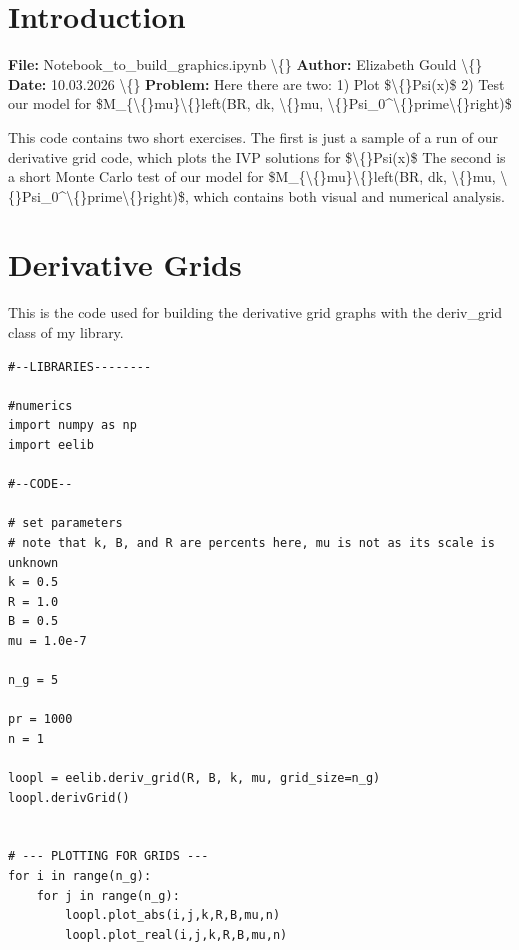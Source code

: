 \documentclass{article}
\begin{document}
\section{Introduction}


\textbf{File:} Notebook\_to\_build\_graphics.ipynb 
\textbackslash\{\}
\textbf{Author:} Elizabeth Gould
\textbackslash\{\}
\textbf{Date:} 10.03.2026
\textbackslash\{\}
\textbf{Problem:} Here there are two:
 1) Plot \$\textbackslash\{\}Psi(x)\$
 2) Test our model for \$M\_\{\textbackslash\{\}mu\}\textbackslash\{\}left(BR, dk, \textbackslash\{\}mu, \textbackslash\{\}Psi\_0\textasciicircum{}\textbackslash\{\}prime\textbackslash\{\}right)\$

This code contains two short exercises. The first is just a sample of a run of our derivative grid code, which plots the IVP solutions for \$\textbackslash\{\}Psi(x)\$ The second is a short Monte Carlo test of our model for \$M\_\{\textbackslash\{\}mu\}\textbackslash\{\}left(BR, dk, \textbackslash\{\}mu, \textbackslash\{\}Psi\_0\textasciicircum{}\textbackslash\{\}prime\textbackslash\{\}right)\$, which contains both visual and numerical analysis.

\section{Derivative Grids}

This is the code used for building the derivative grid graphs with the deriv\_grid class of my library.

\begin{lstlisting}
#--LIBRARIES--------

#numerics
import numpy as np
import eelib

#--CODE--

# set parameters
# note that k, B, and R are percents here, mu is not as its scale is unknown
k = 0.5
R = 1.0
B = 0.5
mu = 1.0e-7

n_g = 5

pr = 1000
n = 1

loopl = eelib.deriv_grid(R, B, k, mu, grid_size=n_g)
loopl.derivGrid()


# --- PLOTTING FOR GRIDS ---
for i in range(n_g):
    for j in range(n_g):
        loopl.plot_abs(i,j,k,R,B,mu,n)
        loopl.plot_real(i,j,k,R,B,mu,n)\end{lstlisting}
\end{document}
